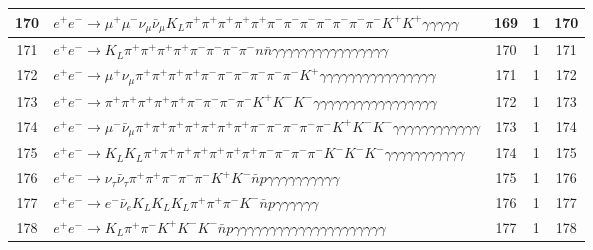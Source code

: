 \documentclass[landscape]{article}
\begin{document}
\begin{table}[htbp!]
\begin{tabular}{|c|>{\centering}p{18cm}|c|c|c|}
\hline
170 & $ e^{+} e^{-} \rightarrow \mu^{+} \mu^{-} \nu_{\mu} \bar{\nu}_{\mu} K_{L} \pi^{+} \pi^{+} \pi^{+} \pi^{+} \pi^{+} \pi^{-} \pi^{-} \pi^{-} \pi^{-} \pi^{-} \pi^{-} \pi^{-} K^{+} K^{+} \gamma \gamma \gamma \gamma \gamma $ & 169 & 1 & 170 \\
\hline
171 & $ e^{+} e^{-} \rightarrow K_{L} \pi^{+} \pi^{+} \pi^{+} \pi^{+} \pi^{-} \pi^{-} \pi^{-} \pi^{-} n \bar{n} \gamma \gamma \gamma \gamma \gamma \gamma \gamma \gamma \gamma \gamma \gamma \gamma \gamma \gamma \gamma \gamma $ & 170 & 1 & 171 \\
\hline
172 & $ e^{+} e^{-} \rightarrow \mu^{+} \nu_{\mu} \pi^{+} \pi^{+} \pi^{+} \pi^{+} \pi^{-} \pi^{-} \pi^{-} \pi^{-} \pi^{-} \pi^{-} K^{+} \gamma \gamma \gamma \gamma \gamma \gamma \gamma \gamma \gamma \gamma \gamma \gamma \gamma \gamma \gamma \gamma $ & 171 & 1 & 172 \\
\hline
173 & $ e^{+} e^{-} \rightarrow \pi^{+} \pi^{+} \pi^{+} \pi^{+} \pi^{+} \pi^{-} \pi^{-} \pi^{-} \pi^{-} K^{+} K^{-} K^{-} \gamma \gamma \gamma \gamma \gamma \gamma \gamma \gamma \gamma \gamma \gamma \gamma \gamma \gamma \gamma \gamma \gamma $ & 172 & 1 & 173 \\
\hline
174 & $ e^{+} e^{-} \rightarrow \mu^{-} \bar{\nu}_{\mu} \pi^{+} \pi^{+} \pi^{+} \pi^{+} \pi^{+} \pi^{+} \pi^{+} \pi^{-} \pi^{-} \pi^{-} \pi^{-} \pi^{-} K^{+} K^{-} K^{-} \gamma \gamma \gamma \gamma \gamma \gamma \gamma \gamma \gamma \gamma \gamma \gamma $ & 173 & 1 & 174 \\
\hline
175 & $ e^{+} e^{-} \rightarrow K_{L} K_{L} \pi^{+} \pi^{+} \pi^{+} \pi^{+} \pi^{+} \pi^{+} \pi^{+} \pi^{-} \pi^{-} \pi^{-} \pi^{-} K^{-} K^{-} K^{-} \gamma \gamma \gamma \gamma \gamma \gamma \gamma \gamma \gamma \gamma \gamma $ & 174 & 1 & 175 \\
\hline
176 & $ e^{+} e^{-} \rightarrow \nu_{\tau} \bar{\nu}_{\tau} \pi^{+} \pi^{+} \pi^{-} \pi^{-} \pi^{-} K^{+} K^{-} \bar{n} p \gamma \gamma \gamma \gamma \gamma \gamma \gamma \gamma \gamma \gamma $ & 175 & 1 & 176 \\
\hline
177 & $ e^{+} e^{-} \rightarrow e^{-} \bar{\nu}_{e} K_{L} K_{L} K_{L} \pi^{+} \pi^{+} \pi^{-} K^{-} \bar{n} p \gamma \gamma \gamma \gamma \gamma \gamma $ & 176 & 1 & 177 \\
\hline
178 & $ e^{+} e^{-} \rightarrow K_{L} \pi^{+} \pi^{-} K^{+} K^{-} K^{-} \bar{n} p \gamma \gamma \gamma \gamma \gamma \gamma \gamma \gamma \gamma \gamma \gamma \gamma \gamma \gamma \gamma \gamma \gamma \gamma \gamma \gamma \gamma $ & 177 & 1 & 178 \\

\end{tabular}
\end{table}
\end{document}
